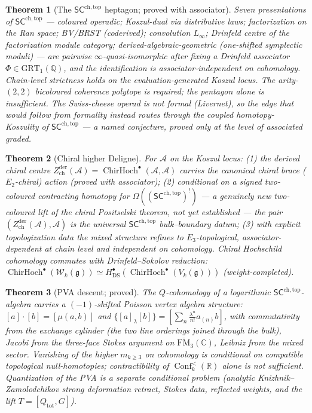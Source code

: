 \documentclass[11pt]{article}
\providecommand{\cA}{\mathcal{A}}
\providecommand{\cW}{\mathcal{W}}
\providecommand{\bC}{\mathbb{C}}
\providecommand{\bR}{\mathbb{R}}
\providecommand{\bQ}{\mathbb{Q}}
\providecommand{\fg}{\mathfrak{g}}
\providecommand{\FM}{\overline{\mathrm{FM}}}
\providecommand{\ChirHoch}{\operatorname{ChirHoch}}
\providecommand{\Zder}{Z^{\mathrm{der}}_{\mathrm{ch}}}
\providecommand{\SCchtop}{\mathsf{SC}^{\mathrm{ch,top}}}
\providecommand{\Conf}{\operatorname{Conf}}
\newtheorem{theorem}{Theorem}[section]
\begin{document}
\begin{theorem}[The $\SCchtop$ heptagon; proved with associator]
\label{thm:heptagon}
Seven presentations of $\SCchtop$ --- coloured operadic; Koszul-dual
via distributive laws; factorization on the Ran space; BV/BRST
(coderived); convolution $L_\infty$; Drinfeld centre of the
factorization module category; derived-algebraic-geometric
(one-shifted symplectic moduli) --- are pairwise
$\infty$-quasi-isomorphic after fixing a Drinfeld associator
$\Phi\in\mathrm{GRT}_1(\bQ)$, and the identification is
associator-independent on cohomology. Chain-level strictness holds on
the evaluation-generated Koszul locus. The arity-$(2,2)$ bicoloured
coherence polytope is required; the pentagon alone is insufficient.
The Swiss-cheese operad is \emph{not} formal \textup{(Livernet)}, so
the edge that would follow from formality instead routes through the
coupled homotopy-Koszulity of $\SCchtop$ --- a named conjecture, proved
only at the level of associated graded.
\end{theorem}

\begin{theorem}[Chiral higher Deligne]\label{thm:deligne}
For $\cA$ on the Koszul locus: \textup{(1)} the derived chiral centre
$\Zder(\cA)=\ChirHoch^\bullet(\cA,\cA)$ carries the canonical chiral
brace \textup{($E_2$-chiral)} action \textup{(proved with associator)};
\textup{(2)} conditional on a signed two-coloured contracting homotopy
for $\Omega((\SCchtop)^!)$ --- a genuinely new two-coloured lift of the
chiral Positselski theorem, not yet established --- the pair
$(\Zder(\cA),\cA)$ is the universal $\SCchtop$ bulk--boundary datum;
\textup{(3)} with explicit topologization data the mixed structure
refines to $E_3$-topological, associator-dependent at chain level and
independent on cohomology. Chiral Hochschild cohomology commutes with
Drinfeld--Sokolov reduction:
$\ChirHoch^\bullet(\cW_k(\fg))\simeq
H^\bullet_{\mathrm{DS}}(\ChirHoch^\bullet(V_k(\fg)))$
\textup{(weight-completed)}.
\end{theorem}

\begin{theorem}[PVA descent; proved]\label{thm:pva}
The $Q$-cohomology of a logarithmic $\SCchtop$-algebra carries a
$(-1)$-shifted Poisson vertex algebra structure:
$[a]\cdot[b]=[\mu(a,b)]$ and
$\{[a]_\lambda[b]\}=[\sum_n\frac{\lambda^n}{n!}a_{(n)}b]$, with
commutativity from the exchange cylinder \textup{(the two line
orderings joined through the bulk)}, Jacobi from the three-face Stokes
argument on $\FM_3(\bC)$, Leibniz from the mixed sector. Vanishing of
the higher $m_{k\ge3}$ on cohomology is \emph{conditional} on
compatible topological null-homotopies; contractibility of
$\Conf^{<}_k(\bR)$ alone is not sufficient. Quantization of the PVA is
a separate conditional problem \textup{(analytic
Knizhnik--Zamolodchikov strong deformation retract, Stokes data,
reflected weights, and the lift $T=[Q_{\mathrm{tot}},G]$)}.
\end{theorem}
\end{document}
